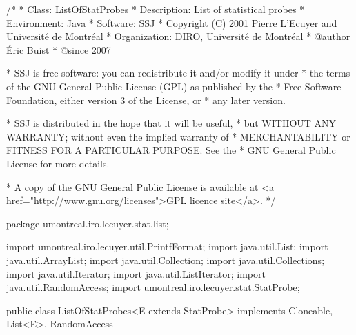 \begin{code}
\begin{hide}
/*
 * Class:        ListOfStatProbes
 * Description:  List of statistical probes
 * Environment:  Java
 * Software:     SSJ 
 * Copyright (C) 2001  Pierre L'Ecuyer and Université de Montréal
 * Organization: DIRO, Université de Montréal
 * @author       Éric Buist 
 * @since        2007

 * SSJ is free software: you can redistribute it and/or modify it under
 * the terms of the GNU General Public License (GPL) as published by the
 * Free Software Foundation, either version 3 of the License, or
 * any later version.

 * SSJ is distributed in the hope that it will be useful,
 * but WITHOUT ANY WARRANTY; without even the implied warranty of
 * MERCHANTABILITY or FITNESS FOR A PARTICULAR PURPOSE.  See the
 * GNU General Public License for more details.

 * A copy of the GNU General Public License is available at
   <a href="http://www.gnu.org/licenses">GPL licence site</a>.
 */
\end{hide}
package umontreal.iro.lecuyer.stat.list;\begin{hide}

import umontreal.iro.lecuyer.util.PrintfFormat;
import java.util.List;
import java.util.ArrayList;
import java.util.Collection;
import java.util.Collections;
import java.util.Iterator;
import java.util.ListIterator;
import java.util.RandomAccess;
import umontreal.iro.lecuyer.stat.StatProbe;
\end{hide}


public class ListOfStatProbes<E extends StatProbe>
                                implements Cloneable, List<E>, RandomAccess\begin{hide} {

   // probes must implement RandomAccess, otherwise this class must not implement RandomAccess.
   private List<E> probes;
   private List<ArrayOfObservationListener> listeners = new ArrayList<ArrayOfObservationListener>();
   protected boolean collect = true;
   protected boolean broadcast = false;
   protected String name;\end{hide}
\end{code}
